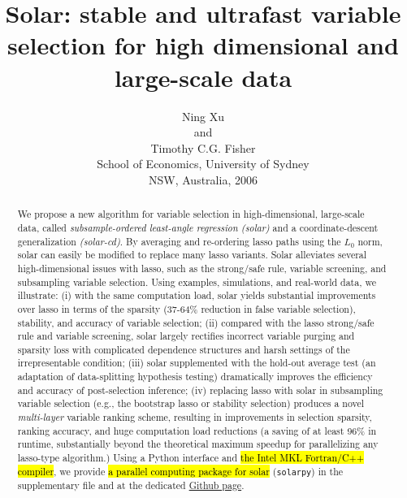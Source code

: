 \documentclass[12pt]{article}
\begin{document}

\title{\bf Solar: stable and ultrafast variable selection for high dimensional and large-scale data}
\author{Ning Xu \hspace{.4cm}\\
  and \hspace{.4cm}\\
  Timothy C.G. Fisher \hspace{.4cm}\\
  School of Economics, University of Sydney \hspace{.4cm}\\
  NSW, Australia, 2006}
\clearpage\maketitle

\begin{abstract}
  We propose a new algorithm for variable selection in high-dimensional, large-scale data, called \emph{subsample-ordered least-angle regression (solar)} and a coordinate-descent generalization \emph{(solar-cd)}. By averaging and re-ordering lasso paths using the $L_0$ norm, solar can easily be modified to replace many lasso variants. Solar alleviates several high-dimensional issues with lasso, such as the strong/safe rule, variable screening, and subsampling variable selection. Using examples, simulations, and real-world data, we illustrate: (i) with the same computation load, solar yields substantial improvements over lasso in terms of the sparsity (37-64\% reduction in false variable selection), stability, and accuracy of variable selection; (ii) compared with the lasso strong/safe rule and variable screening, solar largely rectifies incorrect variable purging and sparsity loss with complicated dependence structures and harsh settings of the irrepresentable condition; (iii) solar supplemented with the hold-out average test (an adaptation of data-splitting hypothesis testing) dramatically improves the efficiency and accuracy of post-selection inference; (iv) replacing lasso with solar in subsampling variable selection (e.g., the bootstrap lasso or stability selection) produces a novel \emph{multi-layer} variable ranking scheme, resulting in improvements in selection sparsity, ranking accuracy, and huge computation load reductions (a saving of at least 96\% in runtime, substantially beyond the theoretical maximum speedup for parallelizing any lasso-type algorithm.) Using a Python interface and \hl{the Intel MKL Fortran/C++ compiler}, we provide \hl{a parallel computing package for solar} (\texttt{solarpy}) in the supplementary file and at the dedicated \href{https://github.com/isaac2math/solarpy}{Github page}.
\end{abstract}
\end{document}
